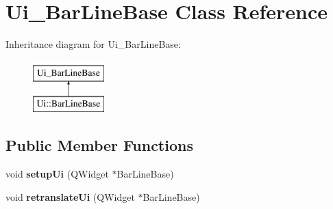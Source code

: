 \hypertarget{class_ui___bar_line_base}{}\section{Ui\+\_\+\+Bar\+Line\+Base Class Reference}
\label{class_ui___bar_line_base}
Inheritance diagram for Ui\+\_\+\+Bar\+Line\+Base\+:\begin{figure}[H]
\begin{center}
\leavevmode
\includegraphics[height=2.000000cm]{class_ui___bar_line_base}
\end{center}
\end{figure}
\subsection*{Public Member Functions}
\begin{DoxyCompactItemize}
\item 
\mbox{\label{class_ui___bar_line_base_aebe8b17f7b7cec9954c4512627513a55}} 
void {\bfseries setup\+Ui} (Q\+Widget $\ast$Bar\+Line\+Base)
\item 
\mbox{\label{class_ui___bar_line_base_a4fb0f75a42edac61e608ec4d42db3faa}} 
void {\bfseries retranslate\+Ui} (Q\+Widget $\ast$Bar\+Line\+Base)
\end{DoxyCompactItemize}
